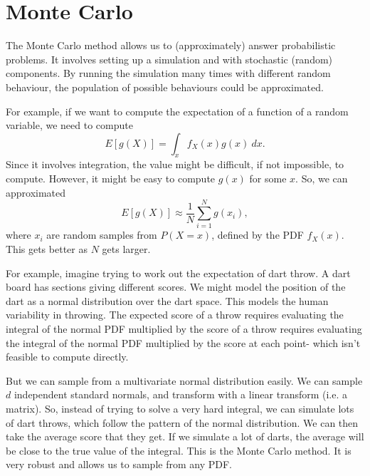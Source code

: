 \documentclass[a4paper, openany]{memoir}
\begin{document}
\newpage

\section{Monte Carlo}
The Monte Carlo method allows us to (approximately) answer probabilistic problems. It involves setting up a simulation and with stochastic (random) components. By running the simulation many times with different random behaviour, the population of possible behaviours could be approximated.

For example, if we want to compute the expectation of a function of a random variable, we need to compute
\[E[g(X)] = \int_x f_X(x) g(x) \ dx.\]
Since it involves integration, the value might be difficult, if not impossible, to compute. However, it might be easy to compute $g(x)$ for some $x$. So, we can approximated
\[E[g(X)] \approx \frac{1}{N} \sum_{i=1}^N g(x_i),\]
where $x_i$ are random samples from $P(X = x)$, defined by the PDF $f_X(x)$. This gets better as $N$ gets larger.

For example, imagine trying to work out the expectation of dart throw. A dart board has sections giving different scores. We might model the position of the dart as a normal distribution over the dart space. This models the human variability in throwing. The expected score of a throw requires evaluating the integral of the normal PDF multiplied by the score of a throw requires evaluating the integral of the normal PDF multiplied by the score at each point- which isn't feasible to compute directly.

But we can sample from a multivariate normal distribution easily. We can sample $d$ independent standard normals, and transform with a linear transform (i.e. a matrix). So, instead of trying to solve a very hard integral, we can simulate lots of dart throws, which follow the pattern of the normal distribution. We can then take the average score that they get. If we simulate a lot of darts, the average will be close to the true value of the integral. This is the Monte Carlo method. It is very robust and allows us to sample from any PDF. 
\end{document}
